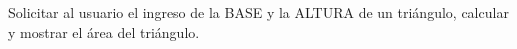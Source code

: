 Solicitar al usuario el ingreso de la BASE y la ALTURA de un tri\'angulo, calcular y mostrar el \'area del tri\'angulo.



\volverindice
\newpage
